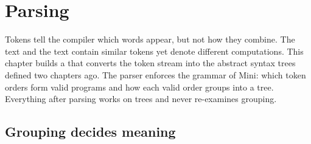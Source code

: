 \chapter{Parsing}
\label{ch:parsing}

Tokens tell the compiler which words appear, but not how they combine.
The text  and the text  contain similar tokens yet denote different computations.
This chapter builds a  that converts the token stream into the abstract syntax trees defined two chapters ago.
The parser enforces the grammar of Mini: which token orders form valid programs and how each valid order groups into a tree.
Everything after parsing works on trees and never re-examines grouping.

\section{Grouping decides meaning}
\label{sec:ch04-grouping-meaning}

